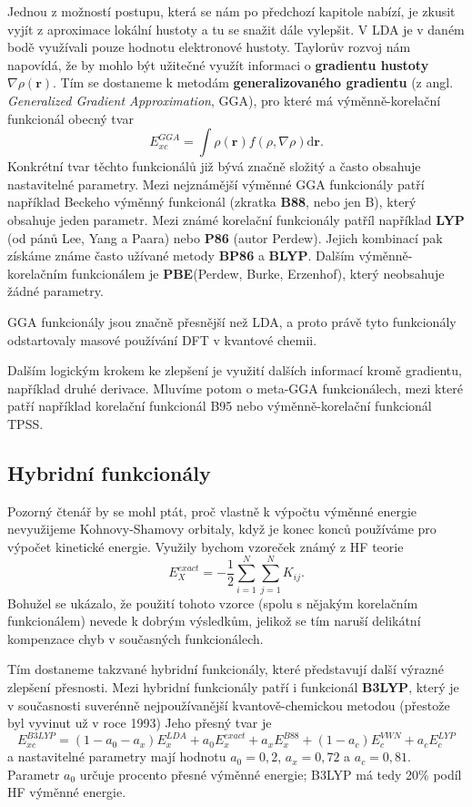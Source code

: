 Jednou z možností postupu, která se nám po předchozí kapitole nabízí, je zkusit vyjít z aproximace lokální hustoty a tu se snažit dále vylepšit. V LDA je v daném bodě využívali pouze hodnotu elektronové hustoty. Taylorův rozvoj nám napovídá, že by mohlo být užitečné využít informaci o \textbf{gradientu hustoty} $\nabla\rho(\textbf{r})$. 
Tím se dostaneme k metodám \textbf{generalizovaného gradientu} (z angl. \textit{Generalized Gradient Approximation}, GGA), pro které má výměnně-korelační funkcionál obecný tvar
\begin{equation}
E_{xc}^{GGA}=\int \rho(\textbf{r})f(\rho,\nabla\rho) \mathrm{d}\textbf{r} .
\end{equation}
Konkrétní tvar těchto funkcionálů již bývá značně složitý a často obsahuje nastavitelné parametry. Mezi nejznámější výměnné GGA funkcionály patří například Beckeho výměnný funkcionál (zkratka \textbf{B88}, nebo jen B), který obsahuje jeden parametr. Mezi známé korelační funkcionály patříl například \textbf{LYP} (od pánů Lee, Yang a Paara) nebo \textbf{P86} (autor Perdew). Jejich kombinací pak získáme známe často užívané metody \textbf{BP86} a \textbf{BLYP}. Dalším výměnně-korelačním funkcionálem je \textbf{PBE}(Perdew, Burke, Erzenhof), který neobsahuje žádné parametry.

GGA funkcionály jsou značně přesnější než LDA, a proto právě tyto funkcionály odstartovaly masové používání DFT v kvantové chemii.

Dalším logickým krokem ke zlepšení je využití dalších informací kromě gradientu, například druhé derivace. Mluvíme potom o meta-GGA funkcionálech, mezi které patří například korelační funkcionál B95 nebo výměnně-korelační funkcionál TPSS.

\subsection{Hybridní funkcionály}
Pozorný čtenář by se mohl ptát, proč vlastně k výpočtu výměnné energie nevyužijeme Kohnovy-Shamovy orbitaly, když je konec konců používáme pro výpočet kinetické energie. Využily bychom vzoreček známý z HF teorie 
\begin{equation}
E_X^{exact}=-\frac{1}{2}\sum_{i=1}^N\sum_{j=1}^N K_{ij} . 
\end{equation}
Bohužel se ukázalo, že použití tohoto vzorce (spolu s nějakým korelačním funkcionálem) nevede k dobrým výsledkům, jelikož se tím naruší delikátní kompenzace chyb v současných funkcionálech.

Tím dostaneme takzvané hybridní funkcionály, které představují další výrazné zlepšení přesnosti.
Mezi hybridní funkcionály patří i funkcionál \textbf{B3LYP}, který je v současnosti suverénně nejpoužívanější kvantově-chemickou metodou (přestože byl vyvinut už v roce 1993)
Jeho přesný tvar je
\begin{equation}
E_{xc}^{B3LYP}=(1-a_0-a_x)E_x^{LDA}+a_0E_x^{exact}+a_xE_x^{B88}+(1-a_c)E_c^{VWN}+a_c E_c^{LYP}
\end{equation}
a nastavitelné parametry mají hodnotu $a_0=0,2$, $a_x=0,72$ a $a_c=0,81$.
Parametr $a_0$ určuje procento přesné výměnné energie; B3LYP má tedy 20\% podíl HF výměnné energie.

